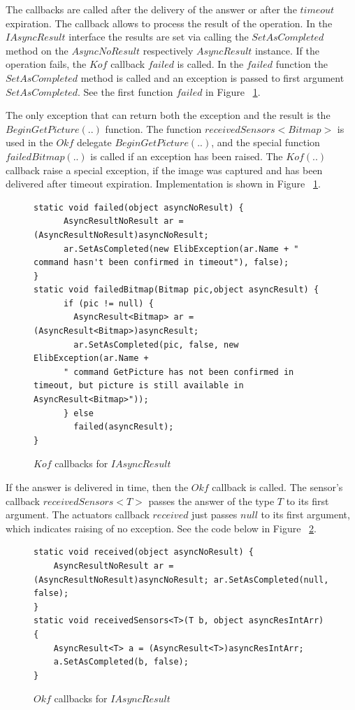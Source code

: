 \documentclass[12pt,notitlepage]{report}
\begin{document}
	The callbacks are called after the delivery of the answer or after the $timeout$ expiration.
	The callback allows to process the result of the operation.
	In the $IAsyncResult$ interface the results are set via calling the $SetAsCompleted$ method 
	on the $AsyncNoResult$ respectively $AsyncResult$ instance.
	If the operation fails, the $Kof$ callback $failed$ is called. 
	In the $failed$ function the $SetAsCompleted$ method is called and an exception is passed to first argument $SetAsCompleted$.
	See the first function $failed$ in Figure ~\ref{Ikofs}.

	The only exception that can return both the exception and the result is the $BeginGetPicture(..)$ function.
	The function $receivedSensors<Bitmap>$ is used in the $Okf$ delegate $BeginGetPicture(..)$, and 
	the special function $failedBitmap(..)$ is called if an exception has been raised.
	The $Kof(..)$ callback raise a special exception, if the image was captured and has been 
	delivered after timeout expiration.
	Implementation is shown in Figure ~\ref{Ikofs}. 

	
\begin{figure}[!hbp]
\begin{lstlisting}
static void failed(object asyncNoResult) {
      AsyncResultNoResult ar = (AsyncResultNoResult)asyncNoResult;
      ar.SetAsCompleted(new ElibException(ar.Name + " command hasn't been confirmed in timeout"), false); 
}
static void failedBitmap(Bitmap pic,object asyncResult) {
      if (pic != null) {
        AsyncResult<Bitmap> ar = (AsyncResult<Bitmap>)asyncResult;        
        ar.SetAsCompleted(pic, false, new ElibException(ar.Name + 
	  " command GetPicture has not been confirmed in timeout, but picture is still available in AsyncResult<Bitmap>"));
      } else
        failed(asyncResult);
}
\end{lstlisting}	
\caption{$Kof$ callbacks for $IAsyncResult$} \label{Ikofs}
\end{figure}


	If the answer is delivered in time, then the $Okf$ callback is called.
	The sensor's callback $receivedSensors<T>$ passes the answer of the type $T$ to its first argument.
	The actuators callback $received$ just passes $null$ to its first argument, which indicates
	raising of no exception.
	See the code below in Figure ~\ref{Iokfs}.


\begin{figure}[!hbp]
\begin{lstlisting}
static void received(object asyncNoResult) {
	AsyncResultNoResult ar = (AsyncResultNoResult)asyncNoResult; ar.SetAsCompleted(null, false); 
}
static void receivedSensors<T>(T b, object asyncResIntArr) {
	AsyncResult<T> a = (AsyncResult<T>)asyncResIntArr;
	a.SetAsCompleted(b, false);
}
\end{lstlisting}	
\caption{$Okf$ callbacks for $IAsyncResult$} \label{Iokfs}
\end{figure}
\end{document}
